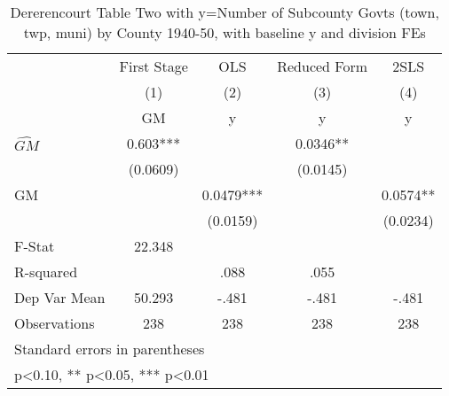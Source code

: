 \begin{table}[htbp]\centering
\def\sym#1{\ifmmode^{#1}\else\(^{#1}\)\fi}
\caption{Dererencourt Table Two with y=Number of Subcounty Govts (town, twp, muni) by County 1940-50, with baseline y and division FEs}
\begin{tabular}{l*{4}{c}}
\toprule
                    & First Stage   &         OLS   &Reduced Form   &        2SLS   \\
                    &\multicolumn{1}{c}{(1)}&\multicolumn{1}{c}{(2)}&\multicolumn{1}{c}{(3)}&\multicolumn{1}{c}{(4)}\\
                    &\multicolumn{1}{c}{GM}&\multicolumn{1}{c}{y}&\multicolumn{1}{c}{y}&\multicolumn{1}{c}{y}\\
\midrule
$\hat{GM}$          &       0.603***&               &      0.0346** &               \\
                    &    (0.0609)   &               &    (0.0145)   &               \\
\addlinespace
GM                  &               &      0.0479***&               &      0.0574** \\
                    &               &    (0.0159)   &               &    (0.0234)   \\
\midrule
F-Stat              &      22.348   &               &               &               \\
R-squared           &               &        .088   &        .055   &               \\
Dep Var Mean        &      50.293   &       -.481   &       -.481   &       -.481   \\
Observations        &         238   &         238   &         238   &         238   \\
\bottomrule
\multicolumn{5}{l}{\footnotesize Standard errors in parentheses}\\
\multicolumn{5}{l}{\footnotesize * p<0.10, ** p<0.05, *** p<0.01}\\
\end{tabular}
\end{table}
